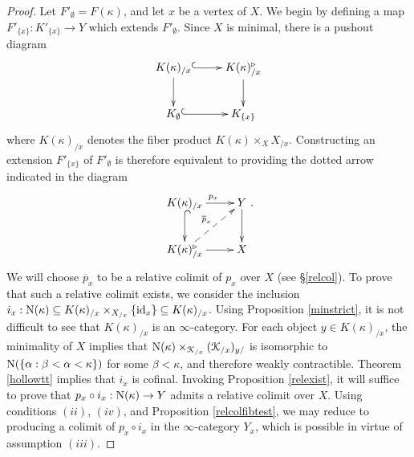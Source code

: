 \begin{proof}
Let $F'_{\emptyset} = F(\kappa)$, and let $x$ be a vertex of $X$. We begin by defining
a map $F'_{\{x\} } : K'_{\{x\} } \rightarrow Y$ which extends $F'_{\emptyset}$. 
Since $X$ is minimal, there is a pushout diagram
$$ \xymatrix{ K(\kappa)_{/x} \ar@{^{(}->}[r] \ar[d] & K(\kappa)_{/x}^{\triangleright} \ar[d] \\
K_{\emptyset} \ar@{^{(}->}[r] &  K_{\{x\} } } $$
where $K(\kappa)_{/x}$ denotes the fiber product $K(\kappa) \times_{X} X_{/x}$. 
Constructing an extension $F'_{ \{x\} }$ of $F'_{\emptyset}$ is therefore equivalent to providing the dotted arrow indicated in the diagram
$$ \xymatrix{ K(\kappa)_{/x} \ar@{^{(}->}[d] \ar[r]^{p_x} & Y \ar[d] \\
K(\kappa)_{/x}^{\triangleright} \ar[r] \ar@{-->}[ur]^{\overline{p}_x} & X }.$$
We will choose $\overline{p}_x$ to be a relative colimit of $p_x$ over $X$ (see \S \ref{relcol}). To prove that
such a relative colimit exists, we consider the inclusion
$i_{x}: \operatorname{N} (\kappa) \subseteq K(\kappa)_{/x} \times_{X_{/x}} \{ \operatorname{id}_{x} \} \subseteq K(\kappa)_{/x}$. Using Proposition \ref{minstrict}, it is not difficult to see that
$K(\kappa)_{/x}$ is an $\infty$-category. For each 
object $y \in K(\kappa)_{/x}$, the minimality of $X$ implies that $\operatorname{N} (\kappa) \times_{ \operatorname{\mathcal{K}}_{/x} } (\operatorname{\mathcal{K}}_{/x})_{y/}$ is isomorphic to $\operatorname{N}(\{ \alpha: \beta < \alpha < \kappa \})$ for some $\beta < \kappa$, and therefore weakly contractible. Theorem \ref{hollowtt} implies that $i_{x}$ is cofinal. Invoking Proposition \ref{relexist}, it will suffice to prove that 
$p_x \circ i_{x}: \operatorname{N} (\kappa) \rightarrow Y$ admits a relative colimit over $X$. Using conditions
$(ii)$, $(iv)$, and Proposition \ref{relcolfibtest}, we may reduce to producing a colimit
of $p_{x} \circ i_{x}$ in the $\infty$-category $Y_{x}$, which is possible in virtue of assumption $(iii)$.


\end{proof}
